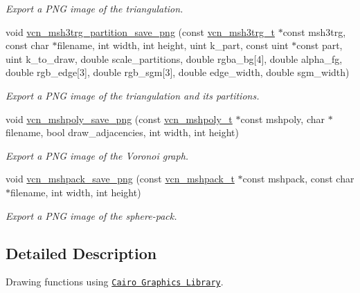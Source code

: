 \begin{DoxyCompactItemize}
\begin{DoxyCompactList}\small\item\em Export a P\+N\+G image of the triangulation. \end{DoxyCompactList}\item 
void \hyperlink{geometric__bot-cairo_8h_ae1ddaf8105a328f7c74387319007a87b}{vcn\+\_\+msh3trg\+\_\+partition\+\_\+save\+\_\+png} (const \hyperlink{geometric__bot_8h_af753a8fb5e30b4d81a02489e92b54df2}{vcn\+\_\+msh3trg\+\_\+t} $\ast$const msh3trg, const char $\ast$filename, int width, int height, uint k\+\_\+part, const uint $\ast$const part, uint k\+\_\+to\+\_\+draw, double scale\+\_\+partitions, double rgba\+\_\+bg\mbox{[}4\mbox{]}, double alpha\+\_\+fg, double rgb\+\_\+edge\mbox{[}3\mbox{]}, double rgb\+\_\+sgm\mbox{[}3\mbox{]}, double edge\+\_\+width, double sgm\+\_\+width)
\begin{DoxyCompactList}\small\item\em Export a P\+N\+G image of the triangulation and its partitions. \end{DoxyCompactList}\item 
void \hyperlink{geometric__bot-cairo_8h_ad4ac0d9c4ad1f317494ab7314317eb1a}{vcn\+\_\+mshpoly\+\_\+save\+\_\+png} (const \hyperlink{geometric__bot_8h_a25e055df6f6e0902c79e1f37ef4cc329}{vcn\+\_\+mshpoly\+\_\+t} $\ast$const mshpoly, char $\ast$filename, bool draw\+\_\+adjacencies, int width, int height)
\begin{DoxyCompactList}\small\item\em Export a P\+N\+G image of the Voronoi graph. \end{DoxyCompactList}\item 
void \hyperlink{geometric__bot-cairo_8h_a2c2aafbd20b8706da1213271dc086be5}{vcn\+\_\+mshpack\+\_\+save\+\_\+png} (const \hyperlink{geometric__bot_8h_aa1e47f3fc55677e96c43ca151d971d86}{vcn\+\_\+mshpack\+\_\+t} $\ast$const mshpack, const char $\ast$filename, int width, int height)
\begin{DoxyCompactList}\small\item\em Export a P\+N\+G image of the sphere-\/pack. \end{DoxyCompactList}\end{DoxyCompactItemize}


\subsection{Detailed Description}
Drawing functions using \href{http://www.cairographics.org}{\tt Cairo Graphics Library}. 

